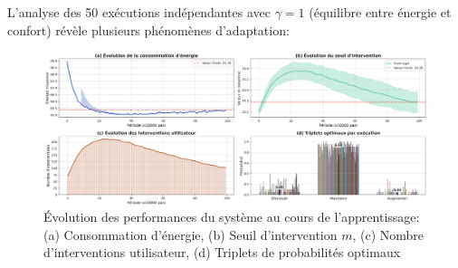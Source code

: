 \documentclass[a4paper,11pt]{article}
\begin{document}
L'analyse des 50 exécutions indépendantes avec $\gamma=1$ (équilibre entre énergie et confort) révèle plusieurs phénomènes d'adaptation:

\begin{figure}[h]
    \centering
    \includegraphics[width=1\textwidth]{figures/evolution_triplets_optimo.png}
    \caption{Évolution des performances du système au cours de l'apprentissage: (a) Consommation d'énergie, (b) Seuil d'intervention $m$, (c) Nombre d'interventions utilisateur, (d) Triplets de probabilités optimaux}
    \label{fig:evolution_triplets}
\end{figure}
\end{document}
